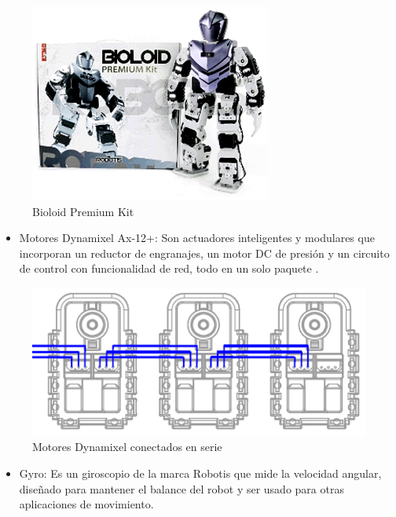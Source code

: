 \begin{figure}[hbtp]

\centering
\includegraphics[scale=0.5]{imagenes/product_bioloid17.png}
\caption{Bioloid Premium Kit}
\end{figure}

\begin{itemize}

\item Motores Dynamixel Ax-12+: Son actuadores inteligentes y modulares que incorporan un reductor de engranajes, un motor DC
de presión y un circuito de control con funcionalidad de red, todo en un solo paquete \cite{manual}. 
\end{itemize}

\begin{figure}[hbtp]

\centering
\includegraphics[scale=0.5]{imagenes/AX-12_serie.png}
\caption{Motores Dynamixel conectados en serie}
\end{figure}

\begin{itemize}
\item Gyro: Es un giroscopio de la marca Robotis que mide la velocidad angular, diseñado para mantener el balance del robot y
ser usado para otras aplicaciones de movimiento. \cite{gyro} 

\end{itemize}

